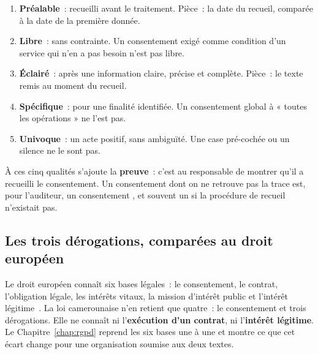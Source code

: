 \begin{enumerate}
    \item \textbf{Préalable}~: recueilli avant le traitement. Pièce~: la date
          du recueil, comparée à la date de la première donnée.
    \item \textbf{Libre}~: sans contrainte. Un consentement exigé comme
          condition d'un service qui n'en a pas besoin n'est pas libre.
    \item \textbf{Éclairé}~: après une information claire, précise et
          complète. Pièce~: le texte remis au moment du recueil.
    \item \textbf{Spécifique}~: pour une finalité identifiée. Un
          consentement global à « toutes les opérations » ne l'est pas.
    \item \textbf{Univoque}~: un acte positif, sans ambiguïté. Une case
          pré-cochée ou un silence ne le sont pas.
\end{enumerate}

À ces cinq qualités s'ajoute la \textbf{preuve}~: c'est au responsable de
montrer qu'il a recueilli le consentement. Un consentement dont on ne
retrouve pas la trace est, pour l'auditeur, un consentement \NEK{}, et
souvent un \NON{} si la procédure de recueil n'existait pas.

\subsection{Les trois dérogations, comparées au droit européen}

Le droit européen connaît six bases légales~: le consentement, le contrat,
l'obligation légale, les intérêts vitaux, la mission d'intérêt public et
l'intérêt légitime~\cite{ue2016rgpd}. La loi camerounaise n'en retient que
quatre~: le consentement et trois dérogations. Elle ne connaît ni
l'\textbf{exécution d'un contrat}, ni l'\textbf{intérêt légitime}. Le
Chapitre~\ref{chap:rgpd} reprend les six bases une à une et montre ce que
cet écart change pour une organisation soumise aux deux textes.

